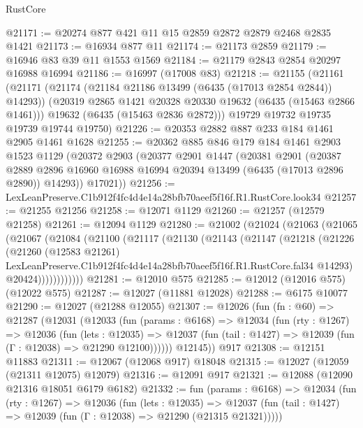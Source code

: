 \begin{lexlean}{RustCore}
\begin{coremodule}
@21171 := @20274 @877 @421 @11 @15 @2859 @2872 @2879 @2468 @2835 @1421
@21173 := @16934 @877 @11
@21174 := @21173 @2859
@21179 := @16946 @83 @39 @11 @1553 @1569
@21184 := @21179 @2843 @2854 @20297 @16988 @16994
@21186 := @16997 (@17008 @83)
@21218 := @21155
    (@21161
      (@21171
        (@21174 (@21184 @21186 @13499 (@6435 (@17013 @2854 @2844)) @14293))
        (@20319 @2865 @1421 @20328 @20330 @19632 (@6435 (@15463 @2866 @1461)))
        @19632
        (@6435 (@15463 @2836 @2872)))
      @19729
      @19732
      @19735
      @19739
      @19744
      @19750)
@21226 := @20353 @2882 @887 @233 @184 @1461 @2905 @1461 @1628
@21255 := @20362
    @885
    @846
    @179
    @184
    @1461
    @2903
    @1523
    @1129
    (@20372
      @2903
      (@20377
        @2901
        @1447
        (@20381
          @2901
          (@20387
            @2889
            @2896
            @16960
            @16988
            @16994
            @20394
            @13499
            (@6435 (@17013 @2896 @2890))
            @14293))
        @17021))
@21256 := LexLeanPreserve.C1b912f4fc4d4e14a28bfb70aeef5f16f.R1.RustCore.look34
@21257 := @21255 @21256
@21258 := @12071 @1129
@21260 := @21257 (@12579 @21258)
@21261 := @12094 @1129
@21280 := @21002
    (@21024
      (@21063
        (@21065
          (@21067
            (@21084
              (@21100
                (@21117
                  (@21130
                    (@21143
                      (@21147
                        (@21218
                          (@21226
                            (@21260
                              (@12583 @21261)
                              LexLeanPreserve.C1b912f4fc4d4e14a28bfb70aeef5f16f.R1.RustCore.fal34
                              @14293)
                            @20424))))))))))))
@21281 := @12010 @575
@21285 := @12012 (@12016 @575) (@12022 @575)
@21287 := @12027 (@11881 @12028)
@21288 := @6175 @10077
@21290 := @12027 (@21288 @12055)
@21307 := @12026
    (fun (fn : @60) =>
    @21287
      (@12031
        (@12033
          (fun (params : @6168) =>
          @12034
            (fun (rty : @1267) =>
            @12036
              (fun (lets : @12035) =>
              @12037 (fun (tail : @1427) => @12039 (fun (Γ : @12038) => @21290 @12100))))))
        @12145))
    @917
@21308 := @12151 @11883
@21311 := @12067 (@12068 @917) @18048
@21315 := @12027 (@12059 (@21311 @12075) @12079)
@21316 := @12091 @917
@21321 := @12088 (@12090 @21316 @18051 @6179 @6182)
@21332 := fun (params : @6168) =>
  @12034
    (fun (rty : @1267) =>
    @12036
      (fun (lets : @12035) =>
      @12037 (fun (tail : @1427) => @12039 (fun (Γ : @12038) => @21290 (@21315 @21321)))))

\end{coremodule}
\end{lexlean}
